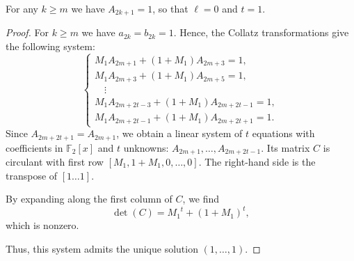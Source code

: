\documentclass[10pt,a4paper]{amsart}
\begin{document}
\begin{proposition} \label{lesAjodd=1}
For any $k \geq m$ we have $A_{2k+1} = 1$, so that $\ell = 0$ and $t = 1$.
\end{proposition}

\begin{proof}
For $k \geq m$ we have $a_{2k} = b_{2k} = 1$. Hence, the Collatz transformations give the following system:
\[
\left\{\begin{array}{l}
M_1 A_{2m+1} + (1+M_1) A_{2m+3} = 1,\\
M_1 A_{2m+3} + (1+M_1) A_{2m+5} = 1,\\
\quad \vdots \\
M_1 A_{2m+2t-3} + (1+M_1) A_{2m+2t-1} = 1,\\
M_1 A_{2m+2t-1} + (1+M_1) A_{2m+2t+1} = 1.
\end{array}\right.
\]
Since $A_{2m+2t+1} = A_{2m+1}$, we obtain a linear system of $t$ equations with coefficients in $\mathbb{F}_2[x]$ and
$t$ unknowns: $A_{2m+1}, \ldots, A_{2m+2t-1}$. Its matrix $C$ is circulant with first row $[M_1, 1+M_1, 0, \ldots, 0]$. The right-hand side is the transpose of $[1 \ldots 1]$.

By expanding along the first column of $C$, we find
\[
\det(C) = {M_1}^t + (1+M_1)^t,
\]
which is nonzero.

Thus, this system admits the unique solution $(1, \ldots, 1)$.
\end{proof}
\end{document}
